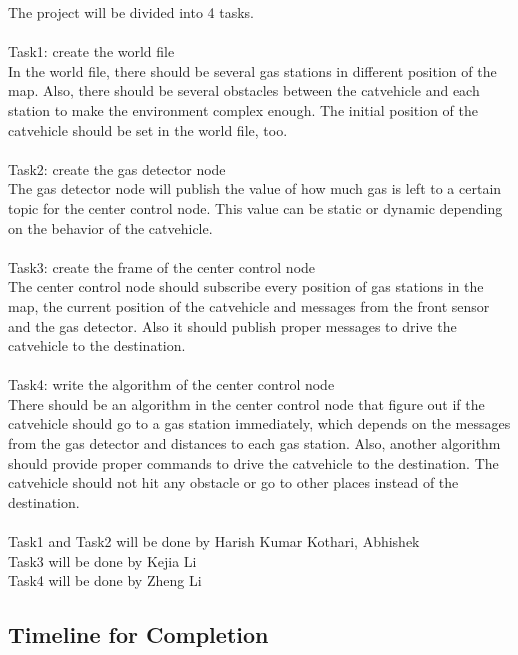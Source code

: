 \documentclass[12pt,onecolumn,titlepage]{article}
\begin{document}
The project will be divided into 4 tasks.\\
\\
\noindent Task1: create the world file\\
In the world file, there should be several gas stations in different position of the map. Also, there should be several obstacles between the catvehicle and each station to make the environment complex enough. The initial position of the catvehicle should be set in the world file, too.\\
\\
\noindent Task2: create the gas detector node\\
The gas detector node will publish the value of how much gas is left to a certain topic for the center control node. This value can be static or dynamic depending on the behavior of the catvehicle.\\
\\
\noindent Task3: create the frame of the center control node\\
The center control node should subscribe every position of gas stations in the map, the current position of the catvehicle and messages from the front sensor and the gas detector. Also it should publish proper messages to drive the catvehicle to the destination.\\ 
\\
\noindent Task4: write the algorithm of the center control node\\
There should be an algorithm in the center control node that figure out if the catvehicle should go to a gas station immediately, which depends on the messages from the gas detector and distances to each gas station. Also, another algorithm should provide proper commands to drive the catvehicle to the destination. The catvehicle should not hit any obstacle or go to other places instead of the destination.\\
\\
Task1 and Task2 will be done by Harish Kumar Kothari, Abhishek\\
Task3 will be done by Kejia Li\\
Task4 will be done by Zheng Li\\

\subsection{Timeline for Completion}
\end{document}
